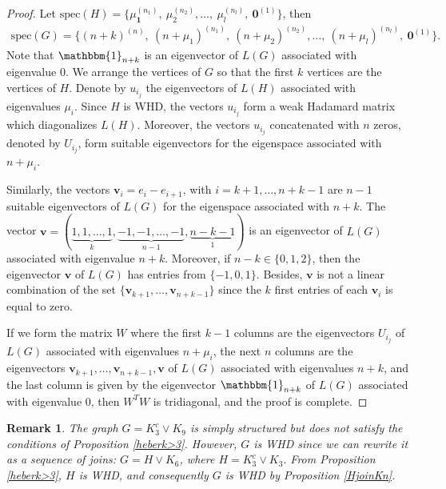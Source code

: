 \documentclass[preprint]{elsarticle}
\newcommand\spec{{\mathrm{spec}}}
\newtheorem{remark}[theorem]{Remark}
\begin{document}
\begin{proof}
Let $\spec(H)=\{\mu_\mathbf{1}^{(n_1)}, \ \mu_2^{(n_2)}, \ldots, \ \mu_l^{(n_l)}, \ \mathbf{0}^{(1)}\}$, then 
\begin{align*}
    \spec(G)=\{(n+k)^{(n)}, \ (n+\mu_1)^{(n_1)}, \ (n+\mu_2)^{(n_2)}, \ldots, \ (n+\mu_l)^{(n_l)}, \ \mathbf{0}^{(1)}\}.
    \end{align*}
Note that $\mathbbm{1}_{n+k}$ is an eigenvector of $L(G)$ associated with eigenvalue 0. We arrange the vertices of $G$ so that the first $k$ vertices are the vertices of $H.$ Denote by $u_{i_j}$ the eigenvectors of $L(H)$  associated with eigenvalues $\mu_i$. Since $H$ is WHD, the vectors $u_{i_j}$ form a weak Hadamard matrix which diagonalizes $L(H)$. Moreover, the vectors $u_{i_j}$ concatenated with $n$ zeros, denoted by $U_{i_j}$, form suitable eigenvectors for the eigenspace associated with $n+\mu_i$. 

Similarly, the vectors $\mathbf{v}_i=e_i-e_{i+1}$, with $i=k+1, \ldots, n+k-1$ are $n-1$ suitable eigenvectors of $L(G)$ for the eigenspace associated with $n+k$. The vector $\mathbf{v}=(\underbrace{1,1,\ldots,1}_{k},\underbrace{-1, -1, \ldots, -1}_{n-1},\underbrace{n-k-1}_1)$ is an eigenvector of $L(G)$ associated with eigenvalue $n+k$. Moreover, if $n-k \in\{0, 1, 2\}$, then the eigenvector $\mathbf{v}$ of $L(G)$ has entries from $\{-1, 0, 1\}$. Besides, $\mathbf{v}$ is not a linear combination of the set $\{\mathbf{v}_{k+1},\ldots, \mathbf{v}_{n+k-1}\}$ since the $k$ first entries of each $\mathbf{v}_{i}$ is equal to zero. 

If we form the matrix $W$ where the first $k-1$ columns are the eigenvectors $U_{i_j}$ of $L(G)$ associated with eigenvalues $n+\mu_i$, the next $n$ columns are the eigenvectors  $\mathbf{v}_{k+1}, \ldots, \mathbf{v}_{n+k-1}, \mathbf{v}$ of $L(G)$ associated with eigenvalues $n+k$, and the last column is given by the eigenvector $\mathbbm{1}_{n+k}$ of $L(G)$ associated with eigenvalue 0, then $W^TW$ is tridiagonal, and the proof is complete. 
\end{proof} 

\begin{remark}
\label{remark1}
The graph $G = K_{3}^{c} \vee K_{9}$ is simply structured but does not satisfy the conditions of Proposition \ref{heberk>3}. However, $G$ is WHD since we can rewrite it as a sequence of joins: 
$G = H \vee K_6$, where $H=K_3^{c} \vee K_{3}.$ From Proposition \ref{heberk>3}, $H$ is WHD, and consequently $G$ is WHD by Proposition \ref{HjoinKn}.
\end{remark}
\end{document}
